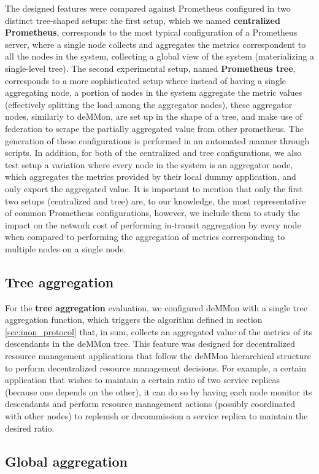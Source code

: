The designed features were compared against Prometheus configured in two distinct tree-shaped setups: the first setup, which we named \textbf{centralized Prometheus}, corresponds to the most typical configuration of a Prometheus server, where a single node collects and aggregates the metrics correspondent to all the nodes in the system, collecting a global view of the system (materializing a single-level tree). The second experimental setup, named \textbf{Prometheus tree}, corresponds to a more sophisticated setup where instead of having a single aggregating node, a portion of nodes in the system aggregate the metric values (effectively splitting the load among the aggregator nodes), these aggregator nodes, similarly to deMMon, are set up in the shape of a tree, and make use of federation to scrape the partially aggregated value from other prometheus. The generation of these configurations is performed in an automated manner through scripts. In addition, for both of the centralized and tree configurations, we also test setup a variation where every node in the system is an aggregator node, which aggregates the metrics provided by their local dummy application, and only export the aggregated value. It is important to mention that only the first two setups (centralized and tree) are, to our knowledge, the most representative of common Prometheus configurations, however, we include them to study the impact on the network cost of performing in-transit aggregation by every node when compared to performing the aggregation of metrics corresponding to multiple nodes on a single node.

\subsection{Tree aggregation}

For the \textbf{tree aggregation} evaluation, we configured deMMon with a single tree aggregation function, which triggers the algorithm defined in section \ref{sec:mon_protocol} that, in sum, collects an aggregated value of the metrics of its descendants in the deMMon tree. This feature was designed for decentralized resource management applications that follow the deMMon hierarchical structure to perform decentralized resource management decisions. For example, a certain application that wishes to maintain a certain ratio of two service replicas (because one depends on the other), it can do so by having each node monitor its descendants and perform resource management actions (possibly coordinated with other nodes) to replenish or decommission a service replica to maintain the desired ratio.



\subsection{Global aggregation}